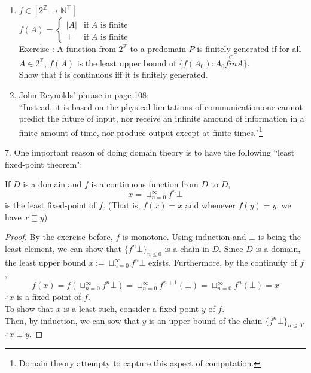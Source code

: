 \documentclass{report}[12pt]
\begin{document}
\begin{enumerate}
\begin{enumerate}
        \item $f\in [2^\mathbb{Z} \rightarrow \mathbb{N}^\top]$ \\
        $f(A) = \begin{cases}
            |A| & \text{if }A \text{ is finite} \\
            \top & \text{if }A \text{ is finite}
        \end{cases}$ \\
        Exercise : A function from $2^\mathbb{Z}$ to a predomain $P$ is finitely generated if for all $A\in 2^\mathbb{Z}$, $f(A)$ is the least upper bound of $\{f(A_0):A_0 \stackrel{\subset}{fin} A\}$. \\
        Show that f is continuous iff it is finitely generated.
        \item John Reynolds' phrase in page 108:\\
        ``Instead, it is based on the physical limitations of communication:one cannot predict the future of input, nor receive an infinite amound of information in a finite amount of time, nor produce output except at finite times."\footnote{Domain theory attempty to capture this aspect of computation.}
    \end{enumerate}
\end{enumerate}
7. One important reason of doing domain theory is to have the following ``least fixed-point theorem":
\begin{proposition}
    If $D$ is a domain and $f$ is a continuous function from $D$ to $D$, \[x=\sqcup_{n=0}^\infty f^n \bot\]
    is the least fixed-point of $f$. (That is, $f(x)=x$ and whenever $f(y)=y$, we have $x\sqsubseteq y$)
\end{proposition}
\begin{proof}
    By the exercise before, $f$ is monotone. Using induction and $\bot$ is being the least element, we can show that $\{f^n \bot\}_{n\le 0}$ is a chain in $D$. Since $D$ is a domain, the least upper bound $x:=\sqcup_{n=0}^\infty f^n \bot$ exists. Furthermore, by the continuity of $f$,
    \[f(x) = f(\sqcup_{n=0}^\infty f^n \bot) = \sqcup_{n=0}^\infty f^{n+1}(\bot) = \sqcup_{n=0}^\infty f^n(\bot) = x\]
    $\therefore x$ is a fixed point of $f$. \\
    To show that $x$ is a least such, consider a fixed point $y$ of $f$. \\
    Then, by induction, we can sow that $y$ is an upper bound of the chain $\{f^n \bot\}_{n\le 0}$. $\therefore x\sqsubseteq y$.
\end{proof}
\end{document}
